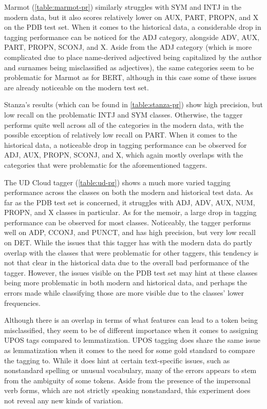 Marmot (\autoref{table:marmot-pr}) similarly struggles with SYM and INTJ in the modern data, but it also scores relatively lower on AUX, PART, PROPN, and X on the PDB test set. When it comes to the historical data, a considerable drop in tagging performance can be noticed for the ADJ category, alongside ADV, AUX, PART, PROPN, SCONJ, and X. Aside from the ADJ category (which is more complicated due to place name-derived adjectived being capitalized by the author and surnames being misclassified as adjectives), the same categories seem to be problematic for Marmot as for BERT, although in this case some of these issues are already noticeable on the modern test set.

Stanza's results (which can be found in \autoref{table:stanza-pr}) show high precision, but low recall on the problematic INTJ and SYM classes. Otherwise, the tagger performs quite well across all of the categories in the modern data, with the possible exception of relatively low recall on PART. When it comes to the historical data, a noticeable drop in tagging performance can be observed for ADJ, AUX, PROPN, SCONJ, and X, which again mostly overlaps with the categories that were problematic for the aforementioned taggers.

The UD Cloud tagger (\autoref{table:ud-pr}) shows a much more varied tagging performance across the classes on both the modern and historical test data. As far as the PDB test set is concerned, it struggles with ADJ, ADV, AUX, NUM, PROPN, and X classes in particular. As for the memoir, a large drop in tagging performance can be observed for most classes. Noticeably, the tagger performs well on ADP, CCONJ, and PUNCT, and has high precision, but very low recall on DET. While the issues that this tagger has with the modern data do partly overlap with the classes that were problematic for other taggers, this tendency is not that clear in the historical data due to the overall bad performance of the tagger. However, the issues visible on the PDB test set may hint at these classes being more problematic in both modern and historical data, and perhaps the errors made while classifying those are more visible due to the classes' lower frequencies.

Although there is an overlap in terms of what features can lead to a token being misclassified, they seem to be of different importance when it comes to assigning UPOS tags compared to lemmatization. UPOS tagging does share the same issue as lemmatization when it comes to the need for some gold standard to compare the tagging to. While it does hint at certain text-specific issues, such as nonstandard spelling or unusual vocabulary, many of the errors appears to stem from the ambiguity of some tokens. Aside from the presence of the impersonal verb forms, which are not strictly speaking nonstandard, this experiment does not reveal any new kinds of variation.

